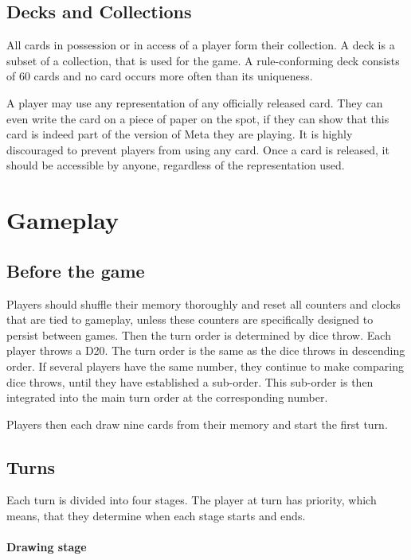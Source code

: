 \documentclass[a4paper,10pt]{article}
\begin{document}
\subsection{Decks and Collections}

All cards in possession or in access of a player form their collection. A deck is a
subset of a collection, that is used for the game. A rule-conforming deck consists of 60
cards and no card occurs more often than its uniqueness.

A player may use any representation of any officially released card. They can even write
the card on a piece of paper on the spot, if they can show that this card is indeed part
of the version of Meta they are playing. It is highly discouraged to prevent players from
using any card. Once a card is released, it should be accessible by anyone, regardless of
the representation used.

\section{Gameplay}

\subsection{Before the game}

Players should shuffle their memory thoroughly and reset all counters and clocks that are
tied to gameplay, unless these counters are specifically designed to persist between
games. Then the turn order is determined by dice throw. Each player throws a
D20. The turn order is the same as the dice throws in descending order. If several 
players have the same number, they continue to make comparing dice throws, until they
have established a sub-order. This sub-order is then integrated into the main turn order
at the corresponding number.

Players then each draw nine cards from their memory and start the first turn.

\subsection{Turns}

Each turn is divided into four stages. The player at turn has priority, which means,
that they determine when each stage starts and ends.

\paragraph{Drawing stage}
\end{document}

